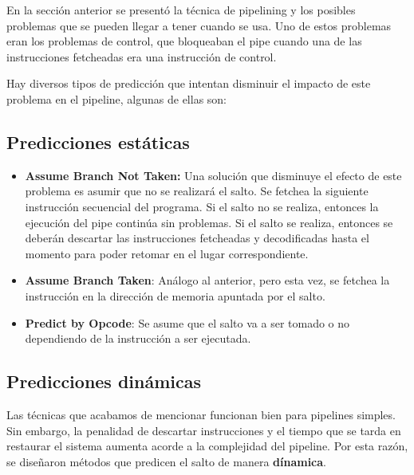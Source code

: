 En la sección anterior se presentó la técnica de pipelining y los posibles problemas que se pueden llegar a tener cuando se usa. Uno de estos problemas eran los problemas de control, que bloqueaban el pipe cuando una de las instrucciones fetcheadas era una instrucción de control.

Hay diversos tipos de predicción que intentan disminuir el impacto de este problema en el pipeline, algunas de ellas son:

\subsection{Predicciones estáticas}
\begin{itemize}
	\item \textbf{Assume Branch Not Taken:} Una solución que disminuye el efecto de este problema es asumir que no se realizará el salto. Se fetchea la siguiente instrucción secuencial del programa. Si el salto no se realiza, entonces la ejecución del pipe continúa sin problemas. Si el salto se realiza, entonces se deberán descartar las instrucciones fetcheadas y decodificadas hasta el momento para poder retomar en el lugar correspondiente.
	\item \textbf{Assume Branch Taken}: Análogo al anterior, pero esta vez, se fetchea la instrucción en la dirección de memoria apuntada por el salto.
	\item \textbf{Predict by Opcode}: Se asume que el salto va a ser tomado o no dependiendo de la instrucción a ser ejecutada.
\end{itemize}

\subsection{Predicciones dinámicas}
Las técnicas que acabamos de mencionar funcionan bien para pipelines simples. Sin embargo, la penalidad de descartar instrucciones y el tiempo que se tarda en restaurar el sistema aumenta acorde a la complejidad del pipeline. Por esta razón, se diseñaron métodos que predicen el salto de manera \textbf{dínamica}.

